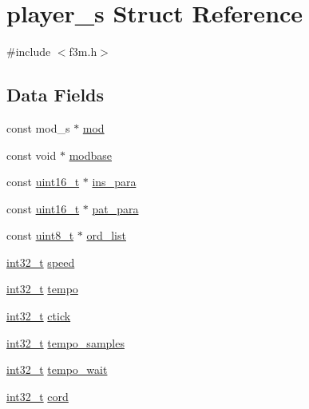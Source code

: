 \hypertarget{structplayer__s}{}\section{player\+\_\+s Struct Reference}
\label{structplayer__s}


{\ttfamily \#include $<$f3m.\+h$>$}

\subsection*{Data Fields}
\begin{DoxyCompactItemize}
\item 
const mod\+\_\+s $\ast$ \hyperlink{structplayer__s_a70b8ab05f506f809cd9afc99200d5ba0}{mod}
\item 
const void $\ast$ \hyperlink{structplayer__s_a1fbc958f686741b23d2eab2ab25deb9f}{modbase}
\item 
const \hyperlink{inttypes_8h_a273cf69d639a59973b6019625df33e30}{uint16\+\_\+t} $\ast$ \hyperlink{structplayer__s_aa957f107f32e90b5718fb1b82630575f}{ins\+\_\+para}
\item 
const \hyperlink{inttypes_8h_a273cf69d639a59973b6019625df33e30}{uint16\+\_\+t} $\ast$ \hyperlink{structplayer__s_a569ee260a2aa80ad84e74e93fd1364c1}{pat\+\_\+para}
\item 
const \hyperlink{inttypes_8h_aba7bc1797add20fe3efdf37ced1182c5}{uint8\+\_\+t} $\ast$ \hyperlink{structplayer__s_a75deecd14f03db103975b397780485fd}{ord\+\_\+list}
\item 
\hyperlink{inttypes_8h_a32f2e37ee053cf2ce8ca28d1f74630e5}{int32\+\_\+t} \hyperlink{structplayer__s_a41b1ead3a9ed4ff1ab0f7de7f959ab43}{speed}
\item 
\hyperlink{inttypes_8h_a32f2e37ee053cf2ce8ca28d1f74630e5}{int32\+\_\+t} \hyperlink{structplayer__s_aa8118e22c2625d08681e4b6279a84122}{tempo}
\item 
\hyperlink{inttypes_8h_a32f2e37ee053cf2ce8ca28d1f74630e5}{int32\+\_\+t} \hyperlink{structplayer__s_a5b9bc2f980e16b0110b923e8d1f4eb7e}{ctick}
\item 
\hyperlink{inttypes_8h_a32f2e37ee053cf2ce8ca28d1f74630e5}{int32\+\_\+t} \hyperlink{structplayer__s_af8d88f5d106f29fd826b5614e9ef8f60}{tempo\+\_\+samples}
\item 
\hyperlink{inttypes_8h_a32f2e37ee053cf2ce8ca28d1f74630e5}{int32\+\_\+t} \hyperlink{structplayer__s_af8184b71d6f7d93d37f1100cb0eb8727}{tempo\+\_\+wait}
\item 
\hyperlink{inttypes_8h_a32f2e37ee053cf2ce8ca28d1f74630e5}{int32\+\_\+t} \hyperlink{structplayer__s_a6852e1632857a8f73025e0db6c8694b2}{cord}

\end{DoxyCompactItemize}
